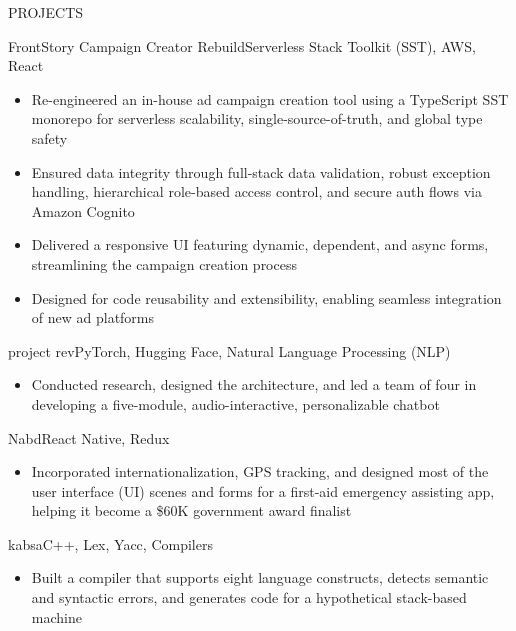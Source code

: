 \documentclass[]{mcdowellcv}
\begin{document}
	\begin{cvsection}{PROJECTS}
		\begin{cvsubsection}{FrontStory Campaign Creator Rebuild}{}{Serverless Stack Toolkit (SST), AWS, React}
			\begin{itemize}
				\item Re-engineered an in-house ad campaign creation tool using a TypeScript SST monorepo for serverless scalability, single-source-of-truth, and global type safety
				\item Ensured data integrity through full-stack data validation, robust exception handling, hierarchical role-based access control, and secure auth flows via Amazon Cognito
				\item Delivered a responsive UI featuring dynamic, dependent, and async forms, streamlining the campaign creation process
				\item Designed for code reusability and extensibility, enabling seamless integration of new ad platforms
			\end{itemize}
		\end{cvsubsection}
		\begin{cvsubsection}{project rev}{}{PyTorch, Hugging Face, Natural Language Processing (NLP)}
			\begin{itemize}
				\item Conducted research, designed the architecture, and led a team of four in developing a five-module, audio-interactive, personalizable chatbot
			\end{itemize}
		\end{cvsubsection}
		\begin{cvsubsection}{Nabd}{}{React Native, Redux}
			\begin{itemize}
				\item Incorporated internationalization, GPS tracking, and designed most of the user interface (UI) scenes and forms for a first-aid emergency assisting app, helping it become a \$60K government award finalist
			\end{itemize}
		\end{cvsubsection}
		\begin{cvsubsection}{kabsa}{}{C++, Lex, Yacc, Compilers}
			\begin{itemize}
				\item Built a compiler that supports eight language constructs, detects semantic and syntactic errors, and generates code for a hypothetical stack-based machine
			\end{itemize}
		\end{cvsubsection}
	\end{cvsection}
\end{document}
